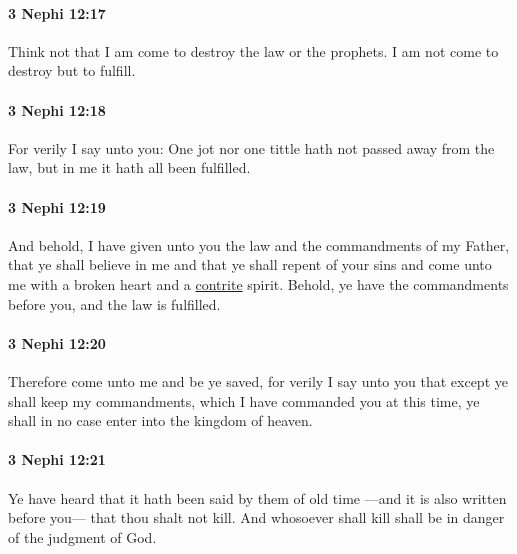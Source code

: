 		\paragraph{3 Nephi 12:17} %
			\label{3NEPHI-12-17}

			Think not that I am come to destroy the law or the prophets.
			I am not come to destroy but to fulfill.

		\paragraph{3 Nephi 12:18} %
			\label{3NEPHI-12-18}

			For verily I say unto you:
			One jot nor one tittle hath not passed away from the law,
			but in me it hath all been fulfilled.

		\paragraph{3 Nephi 12:19} %
			\label{3NEPHI-12-19}

			And behold, I have given unto you
			the law and the commandments of my Father,
			that ye shall believe in me
			and that ye shall repent of your sins
			and come unto me with a broken heart and a \hyperref[CONTRITE]{contrite} spirit.
			Behold, ye have the commandments before you, and the law is fulfilled.

		\paragraph{3 Nephi 12:20} %
			\label{3NEPHI-12-20}

			Therefore come unto me and be ye saved,
			for verily I say unto you
			that except ye shall keep my commandments,
			which I have commanded you at this time,
			ye shall in no case enter into the kingdom of heaven.

		\paragraph{3 Nephi 12:21} %
			\label{3NEPHI-12-21}

			Ye have heard that it hath been said by them of old time
			---and it is also written before you---
			that thou shalt not kill.
			And whosoever shall kill shall be in danger of the judgment of God.

